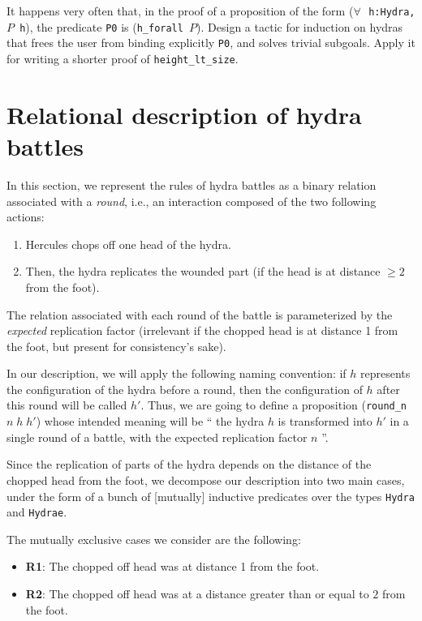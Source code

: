 
\begin{exercise}
It happens very often that, in the proof of  a proposition of the form 
(\texttt{$\forall\,$ h:Hydra, $P$ h}), the predicate \texttt{P0}
is  (\texttt{h\_forall $P$}).  Design a tactic for induction on hydras that frees the user from binding explicitly \texttt{P0},  and solves trivial subgoals. Apply it for writing  a shorter proof of \texttt{height\_lt\_size}.
\end{exercise}
 


\section{Relational description of hydra battles}


In this section, we represent the rules of hydra battles as a binary relation associated with
a \emph{round}, i.e., an interaction composed of the two following actions:
\begin{enumerate}
\item Hercules chops off one head of the hydra.
\item Then, the  hydra replicates the wounded part (if the head is at distance $\geq 2$ from the foot).
\end{enumerate}
The relation associated with each round of the battle is parameterized  by the \emph{expected} replication  factor (irrelevant if the chopped head is at distance 1 from the foot,
but present for consistency's sake).

In our description,  we will apply the following naming convention: if $h$ represents the configuration of the hydra before a round, then the configuration of $h$ after this round will be called $h'$.
 Thus, we are going to define a proposition  (\texttt{round\_n $n\;h\;h'$})  whose intended meaning will be `` the hydra $h$  is transformed into $h'$  in a single round of a battle, with the expected replication factor $n$ ''.


Since the replication of parts of the hydra depends on the distance of the chopped head from  the foot, we  decompose our description into two main  cases, under the form of a bunch of [mutually] inductive predicates over the types \texttt{Hydra} and \texttt{Hydrae}.

The mutually exclusive cases we consider are the following:
\begin{itemize}
\item \textbf{R1}: The chopped off head was at distance 1 from the foot.
\item \textbf{R2}: The chopped off head was at a distance greater than or equal to  $2$ from the foot.
\end{itemize}



